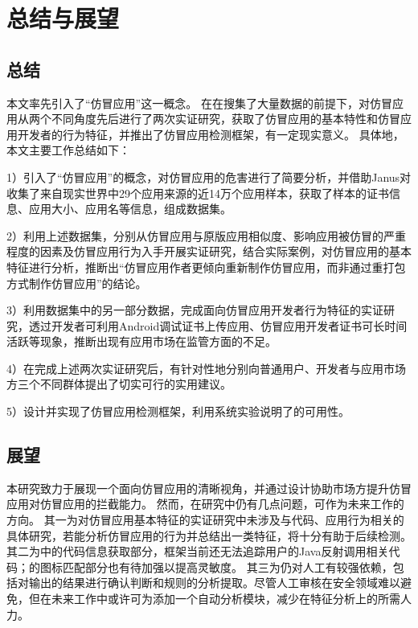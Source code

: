 \chapter{总结与展望}
\label{chp:future}

\section{总结}
本文率先引入了``仿冒应用''这一概念。
在在搜集了大量数据的前提下，对仿冒应用从两个不同角度先后进行了两次实证研究，获取了仿冒应用的基本特性和仿冒应用开发者的行为特征，并推出了仿冒应用检测框架\mytool ，有一定现实意义。
具体地，本文主要工作总结如下：

1）引入了``仿冒应用''的概念，对仿冒应用的危害进行了简要分析，并借助Janus对收集了来自现实世界中29个应用来源的近14万个应用样本，获取了样本的证书信息、应用大小、应用名等信息，组成数据集。

2）利用上述数据集，分别从仿冒应用与原版应用相似度、影响应用被仿冒的严重程度的因素及仿冒应用行为入手开展实证研究，结合实际案例，对仿冒应用的基本特征进行分析，推断出``仿冒应用作者更倾向重新制作仿冒应用，而非通过重打包方式制作仿冒应用''的结论。

3）利用数据集中的另一部分数据，完成面向仿冒应用开发者行为特征的实证研究，透过开发者可利用Android调试证书上传应用、仿冒应用开发者证书可长时间活跃等现象，推断出现有应用市场在监管方面的不足。

4）在完成上述两次实证研究后，有针对性地分别向普通用户、开发者与应用市场方三个不同群体提出了切实可行的实用建议。

5）设计并实现了仿冒应用检测框架\mytool ，利用系统实验说明了\mytool 的可用性。


\section{展望}

本研究致力于展现一个面向仿冒应用的清晰视角，并通过设计\mytool 协助市场方提升仿冒应用对仿冒应用的拦截能力。
然而，在研究中仍有几点问题，可作为未来工作的方向。
其一为对仿冒应用基本特征的实证研究中未涉及与代码、应用行为相关的具体研究，若能分析仿冒应用的行为并总结出一类特征，将十分有助于后续检测。
其二为\mytool 中\componentB 的代码信息获取部分，框架当前还无法追踪用户的Java反射调用相关代码；\mytool 的图标匹配部分也有待加强以提高灵敏度。
其三为\mytool 仍对人工有较强依赖，包括对输出的结果进行确认判断和规则的分析提取。尽管人工审核在安全领域难以避免，但在未来工作中或许可为\mytool 添加一个自动分析模块，减少在特征分析上的所需人力。
